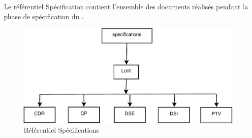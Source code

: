 
Le référentiel Spécification contient l’ensemble des documents réalisés pendant la phase de spécification du \PICCourt.

\clearpage

\begin{figure}[ht]
         \begin{center}
         \includegraphics[scale=0.50]{images/arboSpecifications}
         \end{center}
         \caption{Référentiel Spécifications}
 \end{figure}

